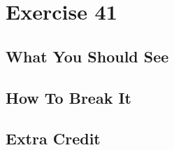 \chapter{Exercise 41}


\section{What You Should See}


\section{How To Break It}


\section{Extra Credit}



